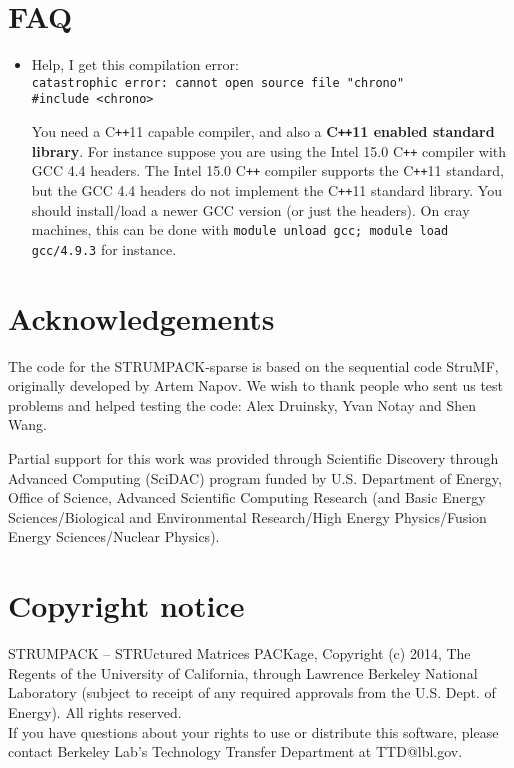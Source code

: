 \documentclass{article}
\begin{document}
\section{FAQ}

\begin{itemize}
\item Help, I get this compilation error:\\
  \verb!catastrophic error: cannot open source file "chrono"! \\
  \verb!#include <chrono>!

  You need a C\texttt{++}11 capable compiler, and also a
  \textbf{C\texttt{++}11 enabled standard library}. For instance
  suppose you are using the Intel 15.0 C\texttt{++} compiler with GCC
  4.4 headers. The Intel 15.0 C\texttt{++} compiler supports the
  C\texttt{++}11 standard, but the GCC 4.4 headers do not implement
  the C\texttt{++}11 standard library. You should install/load a newer
  GCC version (or just the headers). On cray machines, this can be
  done with \lstinline[style=Bash]!module unload gcc; module load gcc/4.9.3! for instance.
\end{itemize}


\section{Acknowledgements}
The code for the STRUMPACK-sparse is based on the sequential code
StruMF, originally developed by Artem Napov. We wish to thank people
who sent us test problems and helped testing the code: Alex Druinsky,
Yvan Notay and Shen Wang.

Partial support for this work was provided through Scientific
Discovery through Advanced Computing (SciDAC) program funded by
U.S. Department of Energy, Office of Science, Advanced Scientific
Computing Research (and Basic Energy Sciences/Biological and
Environmental Research/High Energy Physics/Fusion Energy
Sciences/Nuclear Physics).


\section{Copyright notice}
STRUMPACK -- STRUctured Matrices PACKage, Copyright (c) 2014, The
Regents of the University of California, through Lawrence Berkeley
National Laboratory (subject to receipt of any required approvals from
the U.S. Dept. of Energy). All rights reserved.\\

If you have questions about your rights to use or distribute this
software, please contact Berkeley Lab's Technology Transfer Department
at TTD@lbl.gov.\\
\end{document}
